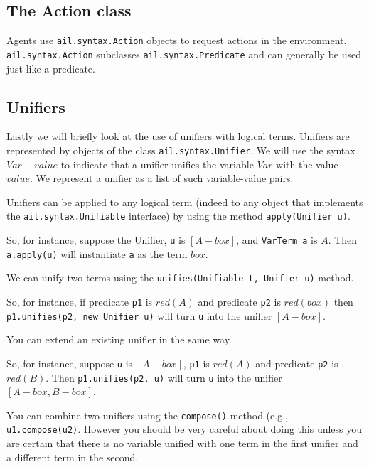 \subsection{The Action class}
Agents use \texttt{ail.syntax.Action} objects to request actions in the environment.  \texttt{ail.syntax.Action} subclasses \texttt{ail.syntax.Predicate} and can generally be used just like a predicate.

\subsection{Unifiers}
Lastly we will briefly look at the use of unifiers with logical terms.  Unifiers are represented by objects of the class \texttt{ail.syntax.Unifier}.  We will use the syntax $Var-value$ to indicate that a unifier unifies the variable $Var$ with the value $value$.  We represent a unifier as a list of such variable-value pairs.
\begin{itemize}
\item Unifiers can be applied to any logical term (indeed to any object that implements the \texttt{ail.syntax.Unifiable} interface) by using the method \texttt{apply(Unifier u)}.

So, for instance, suppose the  Unifier, \texttt{u} is $[A-box]$, and \texttt{VarTerm a} is $A$. Then \texttt{a.apply(u)} will instantiate \texttt{a} as the term $box$.
\item We can unify two terms using the \texttt{unifies(Unifiable t, Unifier u)} method.

So, for instance, if predicate \texttt{p1} is $red(A)$ and predicate \texttt{p2} is $red(box)$ then \texttt{p1.unifies(p2, new Unifier u)} will turn \texttt{u} into the unifier $[A-box]$.
\item You can extend an existing unifier in the same way. 

So, for instance, suppose \texttt{u} is $[A-box]$, \texttt{p1} is $red(A)$ and predicate \texttt{p2} is $red(B)$.  Then \texttt{p1.unifies(p2, u)} will turn \texttt{u} into the unifier $[A-box, B-box]$.
\begin{sloppypar}
\item You can combine two unifiers using the \texttt{compose()} method (e.g., \texttt{u1.compose(u2)}.  However you should be very careful about doing this unless you are certain that there is no variable unified with one term in the first unifier and a different term in the second.
\end{sloppypar}
\end{itemize}

